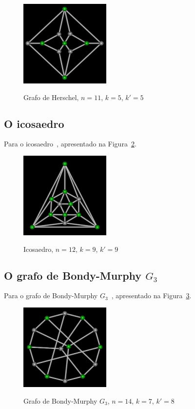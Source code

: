 \begin{figure}[htb]
\centering
\includegraphics[width=0.4\textwidth]{img/herschel.png}
\label{fig:example-herschel}
\caption{Grafo de Herschel, $n=11$, $k=5$, $k'=5$}
\end{figure}


\subsection{O icosaedro}
Para o icosaedro~\cite{cite:example-plato},
apresentado na Figura~\ref{fig:example-icosaedro}.

\begin{figure}[htb]
\centering
\includegraphics[width=0.4\textwidth]{img/icosaedro.png}
\label{fig:example-icosaedro}
\caption{Icosaedro, $n=12$, $k=9$, $k'=9$}
\end{figure}


\subsection{O grafo de Bondy-Murphy $G_3$}
Para o grafo de Bondy-Murphy $G_3$~\cite{cite:example-bondy},
apresentado na Figura~\ref{fig:example-bondymurphyg3}.

\begin{figure}[htb]
\centering
\includegraphics[width=0.4\textwidth]{img/bondymurphyg3.png}
\label{fig:example-bondymurphyg3}
\caption{Grafo de Bondy-Murphy $G_3$, $n=14$, $k=7$, $k'=8$}
\end{figure}


